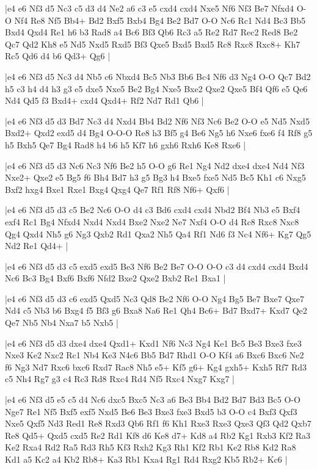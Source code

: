 \whitename{}
\blackname{}
\makegametitle
|e4 e6 Nf3 d5 Nc3 c5 d3 d4 Ne2 a6 c3 e5 cxd4 cxd4 Nxe5 Nf6 Nf3 Be7 Nfxd4 O-O Nf4 Re8 Nf5 Bb4+ Bd2 Bxf5 Bxb4 Bg4 Be2 Bd7 O-O Nc6 Rc1 Nd4 Bc3 Bb5 Bxd4 Qxd4 Re1 h6 b3 Rad8 a4 Bc6 Bf3 Qb6 Rc3 a5 Re2 Rd7 Rec2 Red8 Be2 Qc7 Qd2 Kh8 e5 Nd5 Nxd5 Rxd5 Bf3 Qxe5 Bxd5 Bxd5 Rc8 Rxc8 Rxc8+ Kh7 Rc5 Qd6 d4 b6 Qd3+ Qg6  |

\whitename{}
\blackname{}
\makegametitle
|e4 e6 Nf3 d5 Nc3 d4 Nb5 c6 Nbxd4 Bc5 Nb3 Bb6 Bc4 Nf6 d3 Ng4 O-O Qc7 Bd2 h5 c3 h4 d4 h3 g3 e5 dxe5 Nxe5 Be2 Bg4 Nxe5 Bxe2 Qxe2 Qxe5 Bf4 Qf6 e5 Qe6 Nd4 Qd5 f3 Bxd4+ cxd4 Qxd4+ Rf2 Nd7 Rd1 Qb6  |

\whitename{}
\blackname{}
\makegametitle
|e4 e6 Nf3 d5 d3 Bd7 Nc3 d4 Nxd4 Bb4 Bd2 Nf6 Nf3 Nc6 Be2 O-O e5 Nd5 Nxd5 Bxd2+ Qxd2 exd5 d4 Bg4 O-O-O Re8 h3 Bf5 g4 Be6 Ng5 h6 Nxe6 fxe6 f4 Rf8 g5 h5 Bxh5 Qe7 Bg4 Rad8 h4 b6 h5 Kf7 h6 gxh6 Rxh6 Ke8 Rxe6  |

\whitename{}
\blackname{}
\makegametitle
|e4 e6 Nf3 d5 d3 Nc6 Nc3 Nf6 Be2 h5 O-O g6 Re1 Ng4 Nd2 dxe4 dxe4 Nd4 Nf3 Nxe2+ Qxe2 e5 Bg5 f6 Bh4 Bd7 h3 g5 Bg3 h4 Bxe5 fxe5 Nd5 Bc5 Kh1 c6 Nxg5 Bxf2 hxg4 Bxe1 Rxe1 Bxg4 Qxg4 Qe7 Rf1 Rf8 Nf6+ Qxf6  |

\whitename{}
\blackname{}
\makegametitle
|e4 e6 Nf3 d5 d3 c5 Be2 Nc6 O-O d4 c3 Bd6 cxd4 cxd4 Nbd2 Bf4 Nb3 e5 Bxf4 exf4 Rc1 Bg4 Nfxd4 Nxd4 Nxd4 Bxe2 Nxe2 Ne7 Nxf4 O-O d4 Rc8 Rxc8 Nxc8 Qg4 Qxd4 Nh5 g6 Ng3 Qxb2 Rd1 Qxa2 Nh5 Qa4 Rf1 Nd6 f3 Nc4 Nf6+ Kg7 Qg5 Nd2 Re1 Qd4+  |

\whitename{}
\blackname{}
\makegametitle
|e4 e6 Nf3 d5 d3 c5 exd5 exd5 Be3 Nf6 Be2 Be7 O-O O-O c3 d4 cxd4 cxd4 Bxd4 Nc6 Bc3 Bg4 Bxf6 Bxf6 Nfd2 Bxe2 Qxe2 Bxb2 Re1 Bxa1  |

\whitename{}
\blackname{}
\makegametitle
|e4 e6 Nf3 d5 d3 c6 exd5 Qxd5 Nc3 Qd8 Be2 Nf6 O-O Ng4 Bg5 Be7 Bxe7 Qxe7 Nd4 c5 Nb3 b6 Bxg4 f5 Bf3 g6 Bxa8 Na6 Re1 Qh4 Bc6+ Bd7 Bxd7+ Kxd7 Qe2 Qe7 Nb5 Nb4 Nxa7 b5 Nxb5  |

\whitename{}
\blackname{}
\makegametitle
|e4 e6 Nf3 d5 d3 dxe4 dxe4 Qxd1+ Kxd1 Nf6 Nc3 Ng4 Ke1 Bc5 Be3 Bxe3 fxe3 Nxe3 Ke2 Nxc2 Rc1 Nb4 Ke3 N4c6 Bb5 Bd7 Rhd1 O-O Kf4 a6 Bxc6 Bxc6 Ne2 f6 Ng3 Nd7 Rxc6 bxc6 Rxd7 Rac8 Nh5 e5+ Kf5 g6+ Kg4 gxh5+ Kxh5 Rf7 Rd3 c5 Nh4 Rg7 g3 c4 Rc3 Rd8 Rxc4 Rd4 Nf5 Rxc4 Nxg7 Kxg7  |

\whitename{}
\blackname{}
\makegametitle
|e4 e6 Nf3 d5 e5 c5 d4 Nc6 dxc5 Bxc5 Nc3 a6 Be3 Bb4 Bd2 Bd7 Bd3 Bc5 O-O Nge7 Re1 Nf5 Bxf5 exf5 Nxd5 Be6 Be3 Bxe3 fxe3 Bxd5 b3 O-O c4 Bxf3 Qxf3 Nxe5 Qxf5 Nd3 Red1 Re8 Rxd3 Qb6 Rf1 f6 Kh1 Rxe3 Rxe3 Qxe3 Qf3 Qd2 Qxb7 Re8 Qd5+ Qxd5 cxd5 Re2 Rd1 Kf8 d6 Ke8 d7+ Kd8 a4 Rb2 Kg1 Rxb3 Kf2 Ra3 Ke2 Rxa4 Rd2 Ra5 Rd3 Rh5 Kf3 Rxh2 Kg3 Rh1 Kf2 Rb1 Ke2 Rb8 Kd2 Ra8 Kd1 a5 Kc2 a4 Kb2 Rb8+ Ka3 Rb1 Kxa4 Rg1 Rd4 Rxg2 Kb5 Rb2+ Kc6  |

